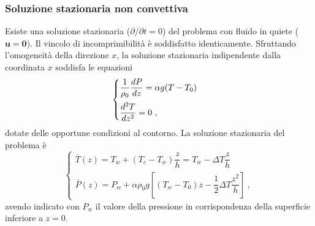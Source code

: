 \documentclass{article}
\begin{document}
\subsubsection{Soluzione stazionaria non convettiva}
Esiste una soluzione stazionaria ($\partial / \partial t = 0$) del problema con fluido in quiete ($\bm{u} = \bm{0}$).
Il vincolo di incomprimibilità è soddisfatto identicamente. Sfruttando l'omogeneità della direzione $x$, la soluzione stazionaria indipendente dalla coordinata $x$ soddisfa le equazioni
\begin{equation}
    \begin{cases}
        \dfrac{1}{\rho_0}\dfrac{d P}{d z} = \alpha g (T-T_0)  \vspace{0.2cm} \\
        \dfrac{d^2 T}{d z^2} = 0 \ ,
    \end{cases}
\end{equation}
dotate delle opportune condizioni al contorno. La soluzione stazionaria del problema è
\begin{equation}
\begin{cases}
    \overline{T}(z) = T_w + (T_c-T_w) \dfrac{z}{h} =
    T_w - \Delta T \dfrac{z}{h} \\
    \overline{P}(z) = P_w + \alpha \rho_0 g \left[ (T_w-T_0) z
    - \dfrac{1}{2} \Delta T \dfrac{z^2}{h} \right] \ ,
\end{cases}
\end{equation}
avendo indicato con $P_w$ il valore della pressione in corrispondenza della superficie inferiore a $z = 0$.
\end{document}
